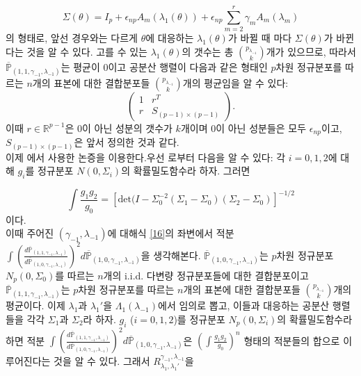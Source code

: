\[
\Sigma(\theta) = I_p + \epsilon_{np} A_m(\lambda_1(\theta)) + \epsilon_{np} \sum_{m=2}^r \gamma_m A_m (\lambda_m)
\]
의 형태로, 앞선 경우와는 다르게 $\theta$에 대응하는 $\lambda_1(\theta)$가 바뀔 때 마다 $\Sigma(\theta)$가 바뀐다는 것을 알 수 있다. 고를 수 있는 $\lambda_1(\theta)$의 갯수는 총 $\binom{p_{\lambda_{-1}}}{k}$개가 있으므로, 따라서 $\overline{\mathbb{P}}_{(1,1,\gamma_{-1}, \lambda_{-1})}$는 평균이 0이고 공분산 행렬이 다음과 같은 형태인 $p$차원 정규분포를 따르는 $n$개의 표본에 대한 결합분포들 $\binom{p_{\lambda_{-1}}}{k}$개의 평균임을 알 수 있다:
\[
 \left(\begin{array}{c|c} 1 & r^T \\ \hline 
r & S_{(p-1)\times (p-1)}\end{array} \right).
\]
이때 $r\in \mathbb{R}^{p-1}$은 0이 아닌 성분의 갯수가 $k$개이며 0이 아닌 성분들은 모두 $\epsilon_{np}$이고, $S_{(p-1)\times(p-1)}$은 앞서 정의한 것과 같다. \\

 이제 \cite[p.2411]{cai2012optimal}에서 사용한 논증을 이용한다.우선 \cite[Lemma 9]{cai2012optimal}로부터 다음을 알 수 있다: 각 $i=0,1,2$에 대해 $g_i$를 정규분포 $N(0,\Sigma_i)$의 확률밀도함수라 하자. 그러면

\[
\int \frac{g_1g_2}{g_0} = \left[ \mbox{det} (I - \Sigma_0^{-2}(\Sigma_1- \Sigma_0)(\Sigma_2-\Sigma_0)\right]^{-1/2}
\]
이다.\\

이때 주어진 $(\gamma_{-1}, \lambda_{-1})$에 대해식  \eqref{16}의 좌변에서 적분 $ \int \left(\frac{d\overline{\mathbb{P}}_{(1,1,\gamma_{-1}, \lambda_{-1})} }{d\overline{\mathbb{P}}_{(1,0,\gamma_{-1}, \lambda_{-1})} } \right)^2 d\overline{\mathbb{P}}_{(1,0,\gamma_{-1}, \lambda_{-1})}$을 생각해본다. 
 $\overline{\mathbb{P}}_{(1,0,\gamma_{-1}, \lambda_{-1})}$는 $p$차원 정규분포 $N_p(0,\Sigma_0)$를 따르는 $n$개의 i.i.d. 다변량 정규분포들에 대한 결합분포이고 $\overline{\mathbb{P}}_{(1,1,\gamma_{-1}, \lambda_{-1})}$는 $p$차원 정규분포를 따르는 $n$개의 표본에 대한 결합분포들 $\binom{p_{\lambda_{-1}}}{k}$개의 평균이다.  이제 $\lambda_1$과 $\lambda_1'$을  $\Lambda_1(\lambda_{-1})$에서 임의로 뽑고, 이들과 대응하는 공분산 행렬들을 각각 $\Sigma_1$과 $\Sigma_2$라 하자. $g_i$ ($i=0,1,2$)를 정규분포 $N_p(0,\Sigma_i)$의 확률밀도함수라 하면 적분 $ \int \left(\frac{d\overline{\mathbb{P}}_{(1,1,\gamma_{-1}, \lambda_{-1})} }{d\overline{\mathbb{P}}_{(1,0,\gamma_{-1}, \lambda_{-1})} } \right)^2 d\overline{\mathbb{P}}_{(1,0,\gamma_{-1}, \lambda_{-1})}$은 $\left( \int \frac{g_1 g_2}{g_0}\right)^n$ 형태의 적분들의 합으로 이루어진다는 것을 알 수 있다.  그래서 $R_{\lambda_1, \lambda_1'}^{\gamma_{-1}, \lambda_{-1}}$을
 
